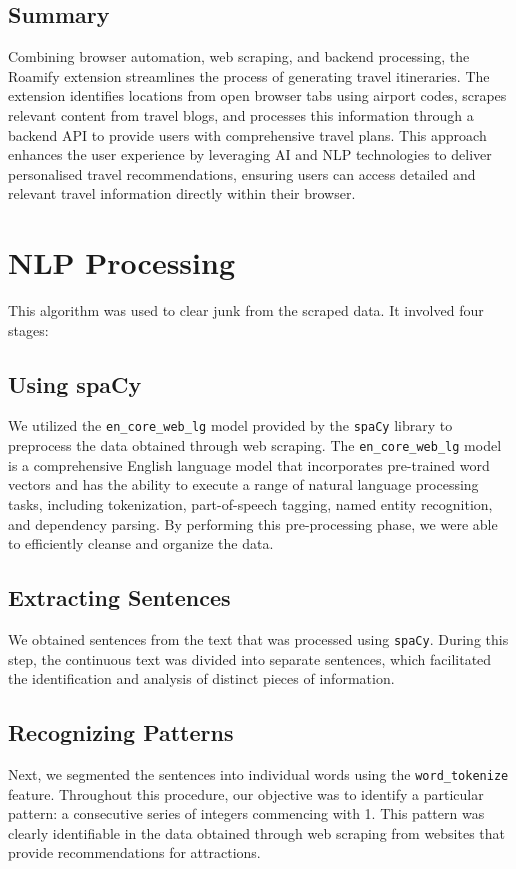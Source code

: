 \documentclass[conference]{IEEEtran}
\begin{document}
    \subsection{Summary}
        Combining browser automation, web scraping, and backend processing, the Roamify extension streamlines the process of generating travel itineraries. The extension identifies locations from open browser tabs using airport codes, scrapes relevant content from travel blogs, and processes this information through a backend API to provide users with comprehensive travel plans. This approach enhances the user experience by leveraging AI and NLP technologies to deliver personalised travel recommendations, ensuring users can access detailed and relevant travel information directly within their browser.

\section{NLP Processing}

    This algorithm was used to clear junk from the scraped data. It involved four stages:

    \subsection{Using spaCy}
    We utilized the \texttt{en\_core\_web\_lg} model provided by the \texttt{spaCy} library to preprocess the data obtained through web scraping. The \texttt{en\_core\_web\_lg} model is a comprehensive English language model that incorporates pre-trained word vectors and has the ability to execute a range of natural language processing tasks, including tokenization, part-of-speech tagging, named entity recognition, and dependency parsing. By performing this pre-processing phase, we were able to efficiently cleanse and organize the data.

    \subsection{Extracting Sentences}
    We obtained sentences from the text that was processed using \texttt{spaCy}. During this step, the continuous text was divided into separate sentences, which facilitated the identification and analysis of distinct pieces of information.

    \subsection{Recognizing Patterns}
    Next, we segmented the sentences into individual words using the \texttt{word\_tokenize} feature. Throughout this procedure, our objective was to identify a particular pattern: a consecutive series of integers commencing with 1. This pattern was clearly identifiable in the data obtained through web scraping from websites that provide recommendations for attractions.
\end{document}
